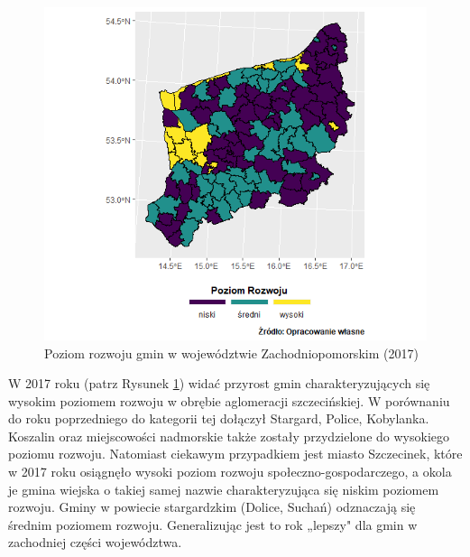 \documentclass{amuthesis}
\begin{document}
\begin{figure}[t]

{\centering \includegraphics[width=1\linewidth]{figures/mapa_2017_bez} 

}

\caption{Poziom rozwoju gmin w województwie Zachodniopomorskim (2017)}\label{fig:rycina7}
\end{figure}

W 2017 roku (patrz Rysunek \ref{fig:rycina7}) widać przyrost gmin charakteryzujących się wysokim poziomem rozwoju w obrębie aglomeracji szczecińskiej.
W porównaniu do roku poprzedniego do kategorii tej dołączył Stargard, Police, Kobylanka.
Koszalin oraz miejscowości nadmorskie także zostały przydzielone do wysokiego poziomu rozwoju.
Natomiast ciekawym przypadkiem jest miasto Szczecinek, które w 2017 roku osiągnęło wysoki poziom rozwoju społeczno-gospodarczego, a okola je gmina wiejska o takiej samej nazwie charakteryzująca się niskim poziomem rozwoju.
Gminy w powiecie stargardzkim (Dolice, Suchań) odznaczają się średnim poziomem rozwoju.
Generalizując jest to rok „lepszy" dla gmin w zachodniej części województwa.
\end{document}

